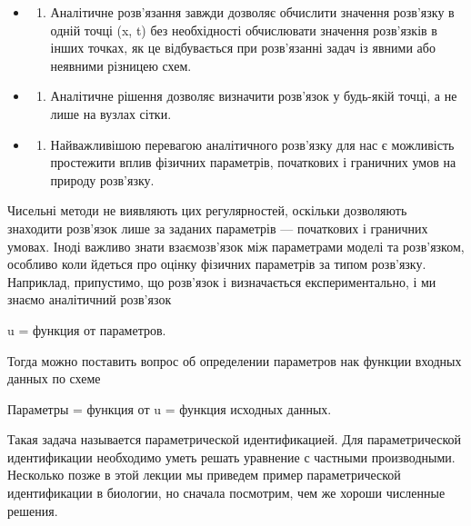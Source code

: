 \documentclass[
  ukrainian,
]{article}
\providecommand{\tightlist}{%
  \setlength{\itemsep}{0pt}\setlength{\parskip}{0pt}}
\begin{document}
\begin{itemize}
\tightlist
\item
  \begin{enumerate}
  \def\labelenumi{\arabic{enumi}.}
  \setcounter{enumi}{1}
  \tightlist
  \item
    Аналітичне розв'язання завжди дозволяє обчислити значення розв'язку
    в одній точці (x, t) без необхідності обчислювати значення
    розв'язків в інших точках, як це відбувається при розв'язанні задач
    із явними або неявними різницею схем.
  \end{enumerate}
\item
  \begin{enumerate}
  \def\labelenumi{\arabic{enumi}.}
  \setcounter{enumi}{2}
  \tightlist
  \item
    Аналітичне рішення дозволяє визначити розв'язок у будь-якій точці, а
    не лише на вузлах сітки.
  \end{enumerate}
\item
  \begin{enumerate}
  \def\labelenumi{\arabic{enumi}.}
  \setcounter{enumi}{3}
  \tightlist
  \item
    Найважливішою перевагою аналітичного розв'язку для нас є можливість
    простежити вплив фізичних параметрів, початкових і граничних умов на
    природу розв'язку.
  \end{enumerate}
\end{itemize}

Чисельні методи не виявляють цих регулярностей, оскільки дозволяють
знаходити розв'язок лише за заданих параметрів --- початкових і
граничних умовах. Іноді важливо знати взаємозв'язок між параметрами
моделі та розв'язком, особливо коли йдеться про оцінку фізичних
параметрів за типом розв'язку. Наприклад, припустимо, що розв'язок і
визначається експериментально, і ми знаємо аналітичний розв'язок

u = функция от параметров.

Тогда можно поставить вопрос об определении параметров нак функции
входных данных по схеме

Параметры = функция от u = функция исходных данных.

Такая задача называется параметрической идентификацией. Для
параметрической идентификации необходимо уметь решать уравнение с
частными производными. Несколько позже в этой лекции мы приведем пример
параметрической идентификации в биологии, но сначала посмотрим, чем же
хороши численные решения.
\end{document}
